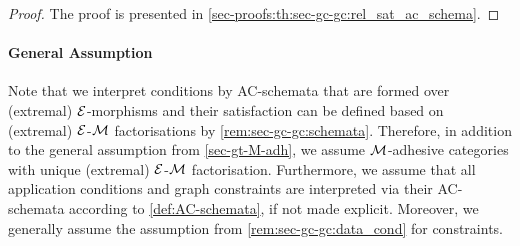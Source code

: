 \begin{proof}
The proof is presented in \cref{sec-proofs:th:sec-gc-gc:rel_sat_ac_schema}.
\end{proof}

\paragraph*{General Assumption}
Note that we interpret conditions by AC-schemata that are formed over (extremal) $\mathcal{E}$-morphisms and their satisfaction can be defined based on (extremal) $\mathcal{E}$-${\cal M}$ factorisations by \cref{rem:sec-gc-gc:schemata}.
Therefore, in addition to the general assumption from \cref{sec-gt-M-adh}, we assume ${\cal M}$-adhesive categories with unique (extremal) $\mathcal{E}$-${\cal M}$ factorisation.
Furthermore, we assume that all application conditions and graph constraints are interpreted via their AC-schemata according to \cref{def:AC-schemata}, if not made explicit.
Moreover, we generally assume the assumption from \cref{rem:sec-gc-gc:data_cond} for constraints.